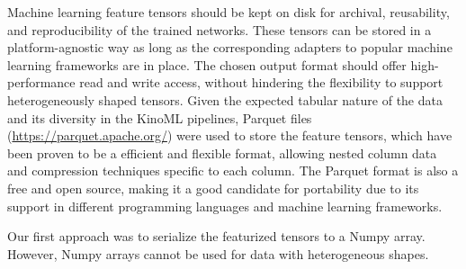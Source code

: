 \documentclass[9pt,lessons]{livecoms}
\begin{document}
Machine learning feature tensors should be kept on disk for archival, reusability, and reproducibility of the trained networks. These tensors can be stored in a platform-agnostic way as long as the corresponding adapters to popular machine learning frameworks are in place.
The chosen output format should offer high-performance read and write access, without hindering the flexibility to support heterogeneously shaped tensors. 
Given the expected tabular nature of the data and its diversity in the KinoML pipelines, Parquet files (\url{https://parquet.apache.org/}) were used to store the feature tensors, which have been proven to be a efficient and flexible format, allowing nested column data and compression techniques specific to each column. The Parquet format is also a free and open source, making it a good candidate for portability due to its support in different programming languages and machine learning frameworks.


Our first approach was to serialize the featurized tensors to a Numpy array. However, Numpy arrays cannot be used for data with heterogeneous shapes. 






\end{document}
